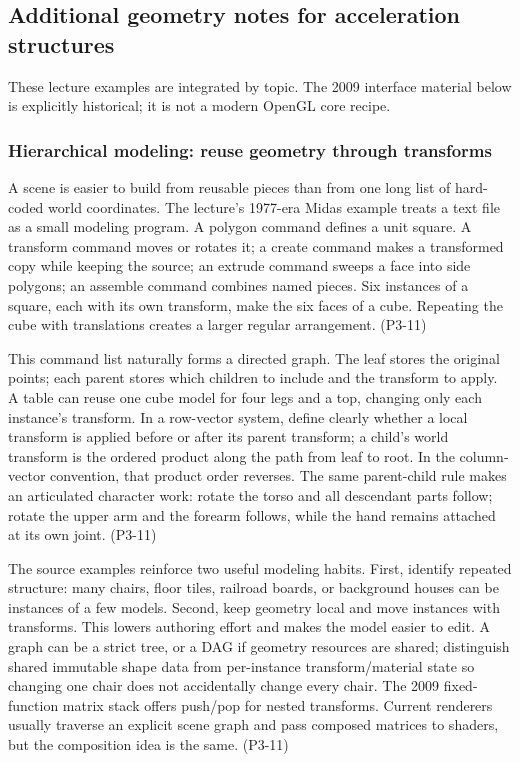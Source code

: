 \subsection{Additional geometry notes for acceleration structures}\label{04-visual-computing-ii-ch029-additional-geometry-notes-for-acceleration-structures}

These lecture examples are integrated by topic. The 2009 interface material below is explicitly historical; it is not a modern OpenGL core recipe.

\subsubsection{Hierarchical modeling: reuse geometry through transforms}\label{04-visual-computing-ii-ch029-hierarchical-modeling-reuse-geometry-through-transforms}

A scene is easier to build from reusable pieces than from one long list of hard-coded world coordinates. The lecture's 1977-era Midas example treats a text file as a small modeling program. A polygon command defines a unit square. A transform command moves or rotates it; a create command makes a transformed copy while keeping the source; an extrude command sweeps a face into side polygons; an assemble command combines named pieces. Six instances of a square, each with its own transform, make the six faces of a cube. Repeating the cube with translations creates a larger regular arrangement. (P3-11)

This command list naturally forms a directed graph. The leaf stores the original points; each parent stores which children to include and the transform to apply. A table can reuse one cube model for four legs and a top, changing only each instance's transform. In a row-vector system, define clearly whether a local transform is applied before or after its parent transform; a child's world transform is the ordered product along the path from leaf to root. In the column-vector convention, that product order reverses. The same parent-child rule makes an articulated character work: rotate the torso and all descendant parts follow; rotate the upper arm and the forearm follows, while the hand remains attached at its own joint. (P3-11)

The source examples reinforce two useful modeling habits. First, identify repeated structure: many chairs, floor tiles, railroad boards, or background houses can be instances of a few models. Second, keep geometry local and move instances with transforms. This lowers authoring effort and makes the model easier to edit. A graph can be a strict tree, or a DAG if geometry resources are shared; distinguish shared immutable shape data from per-instance transform/material state so changing one chair does not accidentally change every chair. The 2009 fixed-function matrix stack offers push/pop for nested transforms. Current renderers usually traverse an explicit scene graph and pass composed matrices to shaders, but the composition idea is the same. (P3-11)

